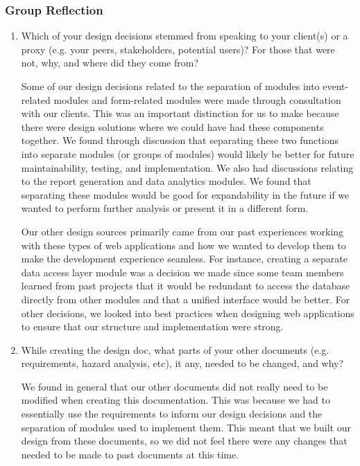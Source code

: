 \documentclass[12pt, titlepage]{article}
\begin{document}
\subsubsection*{Group Reflection}
\begin{enumerate}
  \item Which of your design decisions stemmed from speaking to your client(s)
  or a proxy (e.g. your peers, stakeholders, potential users)? For those that
  were not, why, and where did they come from?
  
  Some of our design decisions related to the separation of modules into event-related modules and form-related modules were made through consultation with our clients. This was an important distinction for us to make because there were design solutions where we could have had these components together. We found through discussion that separating these two functions into separate modules (or groups of modules) would likely be better for future maintainability, testing, and implementation. We also had discussions relating to the report generation and data analytics modules. We found that separating these modules would be good for expandability in the future if we wanted to perform further analysis or present it in a different form. 

  Our other design sources primarily came from our past experiences working with these types of web applications and how we wanted to develop them to make the development experience seamless. For instance, creating a separate data access layer module was a decision we made since some team members learned from past projects that it would be redundant to access the database directly from other modules and that a unified interface would be better. For other decisions, we looked into best practices when designing web applications to ensure that our structure and implementation were strong.

  \item While creating the design doc, what parts of your other documents (e.g.
  requirements, hazard analysis, etc), it any, needed to be changed, and why?

  We found in general that our other documents did not really need to be modified when creating this documentation. This was because we had to essentially use the requirements to inform our design decisions and the separation of modules used to implement them. This meant that we built our design from these documents, so we did not feel there were any changes that needed to be made to past documents at this time.


\end{enumerate}
\end{document}
